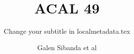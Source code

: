\renewcommand{\lsSeries}{calseries}
\renewcommand{\lsSeriesNumber}{??}

\title{ACAL 49}
\subtitle{Change your subtitle in localmetadata.tex}
\author{Galen Sibanda et al}
